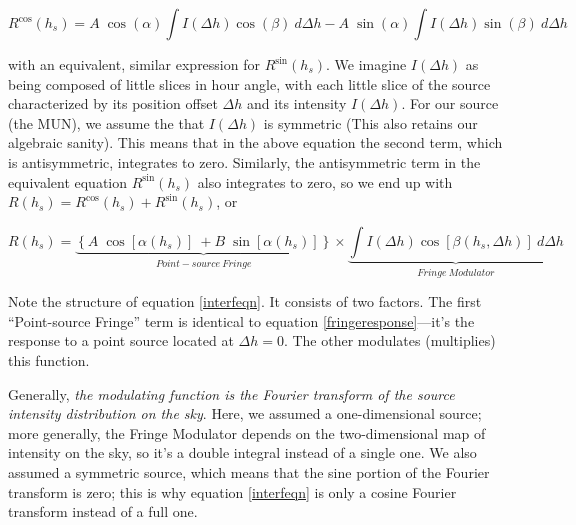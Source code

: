 \documentclass[11pt,preprint]{aastex}
\begin{document}
\begin{equation}
R^{\cos}(h_s) = A \; \cos(\alpha) \int I(\Delta h) \cos( \beta) \ d \Delta h 
-A \; \sin(\alpha) \int I(\Delta h) \sin( \beta) \ d \Delta h 
\end{equation}

\noindent with an equivalent, similar expression for $R^{\sin}(h_s)$. We
imagine $I(\Delta h)$ as being composed of little slices in hour angle,
with each little slice of the source characterized by its position
offset $\Delta h$ and its intensity $I(\Delta h)$. For our source (the
MUN), we assume the that $I(\Delta h)$ is symmetric (This also retains
our algebraic sanity). This means that in the above equation the second
term, which is antisymmetric, integrates to zero.  Similarly, the
antisymmetric term in the equivalent equation $R^{\sin}(h_s)$ also
integrates to zero, so we end up with $R(h_s) = R^{\cos}(h_s) +
R^{\sin}(h_s)$, or

\begin{equation} \label{interfeqn}
R(h_s) = 
\underbrace{ \left\{ A \; \cos[\alpha(h_s)]
\ + B \; \sin[\alpha(h_s)]
\right\}}_{Point-source\ 
Fringe} \times 
\underbrace{\int I(\Delta h) \cos[ \beta(h_s,\Delta h)] \ d \Delta h}_{Fringe \ Modulator} 
\end{equation}


	Note the structure of equation \ref{interfeqn}. It consists of
two factors. The first ``Point-source Fringe'' term is identical to equation
\ref{fringeresponse}---it's the response to a point source located at
$\Delta h=0$. The other modulates (multiplies) this function. 

Generally, {\it the modulating function is the Fourier transform of the
  source intensity distribution on the sky}. 
Here, we assumed a
one-dimensional source; more generally, the Fringe Modulator depends on
the two-dimensional map of intensity on the sky, so it's a double
integral instead of a single one. We also assumed a symmetric source,
  which means that the sine portion of the Fourier
  transform is zero; this is why equation \ref{interfeqn} is only a cosine
  Fourier transform instead of a full one.
\end{document}
